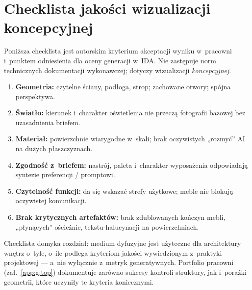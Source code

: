 \section{Checklista jakości wizualizacji koncepcyjnej}
\label{ch04:sec:checklista}

Poniższa checklista jest autorskim kryterium akceptacji wyniku w~pracowni i~punktem odniesienia dla oceny generacji w~IDA. Nie zastępuje norm technicznych dokumentacji wykonawczej; dotyczy wizualizacji \emph{koncepcyjnej}.

\begin{enumerate}
  \item \textbf{Geometria:} czytelne ściany, podłoga, strop; zachowane otwory; spójna perspektywa.
  \item \textbf{Światło:} kierunek i~charakter oświetlenia nie przeczą fotografii bazowej bez uzasadnienia briefem.
  \item \textbf{Materiał:} powierzchnie wiarygodne w~skali; brak oczywistych „rozmyć” AI na dużych płaszczyznach.
  \item \textbf{Zgodność z~briefem:} nastrój, paleta i~charakter wyposażenia odpowiadają syntezie preferencji / promptowi.
  \item \textbf{Czytelność funkcji:} da się wskazać strefy użytkowe; meble nie blokują oczywistej komunikacji.
  \item \textbf{Brak krytycznych artefaktów:} brak zdublowanych kończyn mebli, „płynących” ościeżnic, tekstu-halucynacji na powierzchniach.
\end{enumerate}

Checklista domyka rozdział: medium dyfuzyjne jest użyteczne dla architektury wnętrz o~tyle, o~ile podlega kryteriom jakości wywiedzionym z~praktyki projektowej --- a~nie wyłącznie z~metryk generatywnych. Portfolio pracowni (zał.~\ref{app:g:top}) dokumentuje zarówno sukcesy kontroli struktury, jak i~porażki geometrii, które uczyniły te kryteria koniecznymi.
